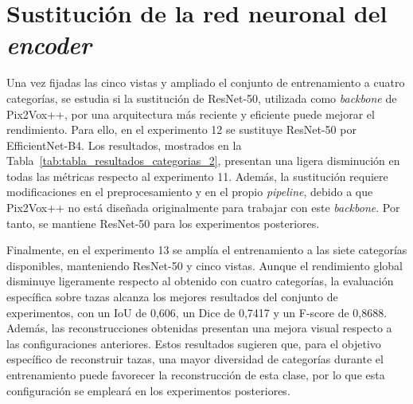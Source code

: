 \documentclass[10pt,a4paper]{report}
\begin{document}
\section{Sustitución de la red neuronal del \textit{encoder}}
\label{sec:encoder_eficientnet}

Una vez fijadas las cinco vistas y ampliado el conjunto de entrenamiento a cuatro categorías, se estudia si la sustitución de ResNet-50, utilizada como \textit{backbone} de Pix2Vox++, por una arquitectura más reciente y eficiente puede mejorar el rendimiento. Para ello, en el experimento 12 se sustituye ResNet-50 por EfficientNet-B4. Los resultados, mostrados en la Tabla~\ref{tab:tabla_resultados_categorias_2}, presentan una ligera disminución en todas las métricas respecto al experimento 11. Además, la sustitución requiere modificaciones en el preprocesamiento y en el propio \textit{pipeline}, debido a que Pix2Vox++ no está diseñada originalmente para trabajar con este \textit{backbone}. Por tanto, se mantiene ResNet-50 para los experimentos posteriores.

Finalmente, en el experimento 13 se amplía el entrenamiento a las siete categorías disponibles, manteniendo ResNet-50 y cinco vistas. Aunque el rendimiento global disminuye ligeramente respecto al obtenido con cuatro categorías, la evaluación específica sobre tazas alcanza los mejores resultados del conjunto de experimentos, con un IoU de 0,606, un Dice de 0,7417 y un F-score de 0,8688. Además, las reconstrucciones obtenidas presentan una mejora visual respecto a las configuraciones anteriores. Estos resultados sugieren que, para el objetivo específico de reconstruir tazas, una mayor diversidad de categorías durante el entrenamiento puede favorecer la reconstrucción de esta clase, por lo que esta configuración se empleará en los experimentos posteriores.

\begin{table}[H]
  \centering
  \caption{Resultados de los experimentos 12 y 13 para diferentes arquitecturas y categorías de entrenamiento.}
  \label{tab:tabla_resultados_categorias_2}
\end{table}
\end{document}
